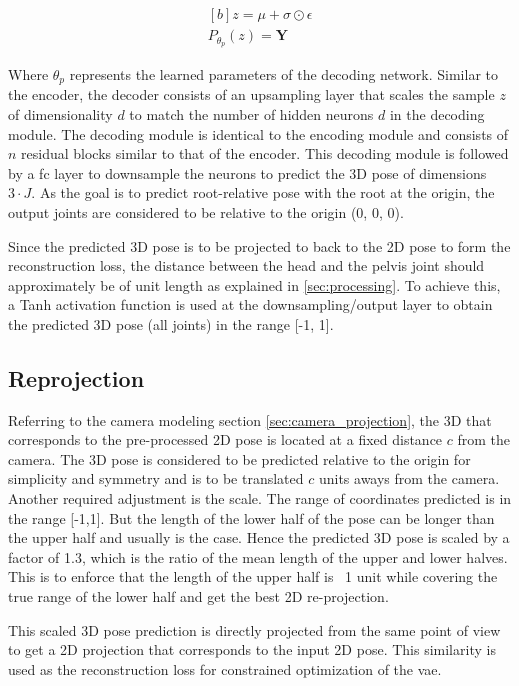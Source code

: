 \begin{equation} \label{eqn:P_fn}
    \begin{gathered}[b]
        z = \mu + \sigma \odot \epsilon \\
        P_{\theta_p}(z) = \textbf{Y}
    \end{gathered}
\end{equation}

Where $\theta_p$ represents the learned parameters of the decoding network. Similar to the encoder, the decoder consists of an upsampling layer that scales the sample $z$ of dimensionality $d$ to match the number of hidden neurons $d$ in the decoding module. The decoding module is identical to the encoding module and consists of $n$ residual blocks similar to that of the encoder. This decoding module is followed by a \ac{fc} layer to downsample the neurons to predict the 3D pose of dimensions $3\!\cdot\!J$. As the goal is to predict root-relative pose with the root at the origin, the output joints are considered to be relative to the origin (0, 0, 0).

Since the predicted 3D pose is to be projected to back to the 2D pose to form the reconstruction loss, the distance between the head and the pelvis joint should approximately be of unit length as explained in \ref{sec:processing}. To achieve this, a Tanh activation function is used at the downsampling/output layer to obtain the predicted 3D pose (all joints) in the range [-1, 1].

\subsection{Reprojection}
\label{subsec:reproject}
Referring to the camera modeling section \ref{sec:camera_projection}, the 3D that corresponds to the pre-processed 2D pose is located at a fixed distance $c$ from the camera. The 3D pose is considered to be predicted relative to the origin for simplicity and symmetry and is to be translated $c$ units aways from the camera. Another required adjustment is the scale. The range of coordinates predicted is in the range [-1,1]. But the length of the lower half of the pose can be longer than the upper half and usually is the case. Hence the predicted 3D pose is scaled by a factor of 1.3, which is the ratio of the mean length of the upper and lower halves. This is to enforce that the length of the upper half is ~1 unit while covering the true range of the lower half and get the best 2D re-projection.

This scaled 3D pose prediction is directly projected from the same point of view to get a 2D projection that corresponds to the input 2D pose. This similarity is used as the reconstruction loss for constrained optimization of the \ac{vae}.

